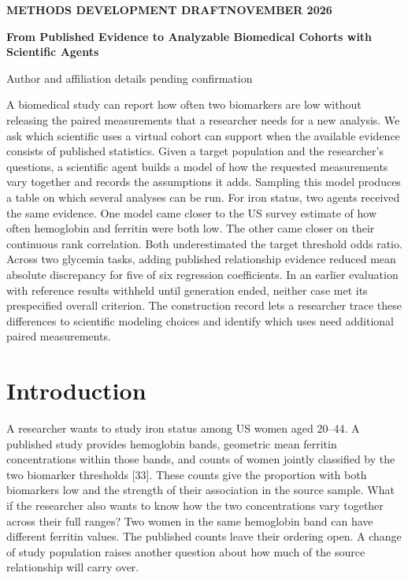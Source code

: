 \documentclass[11pt,letterpaper]{article}
\renewenvironment{abstract}{\small\par\noindent{\sffamily\bfseries\color{ink}Abstract}\quad\ignorespaces}{\par\medskip}
\begin{document}
\thispagestyle{plain}
{\sffamily\footnotesize\color{accent}\bfseries METHODS DEVELOPMENT DRAFT\quad\textbar\quad NOVEMBER 2026\par}
\vspace{.7em}
{\raggedright\sffamily\bfseries\fontsize{24}{29}\selectfont\color{ink}From Published Evidence to Analyzable Biomedical Cohorts with Scientific Agents\par}
\vspace{.5em}
{\small Author and affiliation details pending confirmation\par}
\vspace{.7em}
\begin{abstract}

A biomedical study can report how often two biomarkers are low without releasing the paired measurements that a researcher needs for a new analysis. We ask which scientific uses a virtual cohort can support when the available evidence consists of published statistics. Given a target population and the researcher's questions, a scientific agent builds a model of how the requested measurements vary together and records the assumptions it adds. Sampling this model produces a table on which several analyses can be run. For iron status, two agents received the same evidence. One model came closer to the US survey estimate of how often hemoglobin and ferritin were both low. The other came closer on their continuous rank correlation. Both underestimated the target threshold odds ratio. Across two glycemia tasks, adding published relationship evidence reduced mean absolute discrepancy for five of six regression coefficients. In an earlier evaluation with reference results withheld until generation ended, neither case met its prespecified overall criterion. The construction record lets a researcher trace these differences to scientific modeling choices and identify which uses need additional paired measurements.

\end{abstract}

\section{Introduction}

A researcher wants to study iron status among US women aged 20–\allowbreak{}44. A published study provides hemoglobin bands, geometric mean ferritin concentrations within those bands, and counts of women jointly classified by the two biomarker thresholds [33]. These counts give the proportion with both biomarkers low and the strength of their association in the source sample. What if the researcher also wants to know how the two concentrations vary together across their full ranges? Two women in the same hemoglobin band can have different ferritin values. The published counts leave their ordering open. A change of study population raises another question about how much of the source relationship will carry over.
\end{document}
